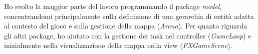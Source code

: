 Ho svolto la maggior parte del lavoro programmando il package \textit{model}, concentrandomi principalmente sulla definizione di una gerarchia di entità adatta al contesto del gioco e sulla gestione della mappa (\textit{Arena}). Per quanto riguarda gli altri package, ho aiutato con la gestione dei task nel controller (\textit{GameLoop}) e inizialmente nella visualizzazione della mappa nella view (\textit{FXGameScene}).